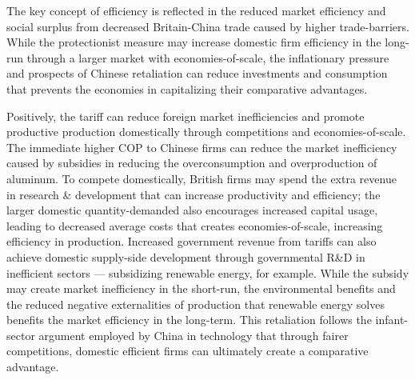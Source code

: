 \documentclass[a4paper,12pt]{article}
\newcommand{\tikzfig}[1]{}
\begin{document}
The key concept of efficiency is reflected in the reduced market efficiency and social surplus from decreased Britain-China trade caused by higher trade-barriers. While the protectionist measure may increase domestic firm efficiency in the long-run through a larger market with economies-of-scale, the inflationary pressure and prospects of Chinese retaliation can reduce investments and consumption that prevents the economies in capitalizing their comparative advantages.


Positively, the tariff can reduce foreign market inefficiencies and promote productive production domestically through competitions and economies-of-scale. The immediate higher COP to Chinese firms can reduce the market inefficiency caused by subsidies in reducing the overconsumption and overproduction of aluminum. To compete domestically, British firms may spend the extra revenue in research \& development that can increase productivity and efficiency; the larger domestic quantity-demanded also encourages increased capital usage, leading to decreased average costs that creates economies-of-scale, increasing efficiency in production.
Increased government revenue from tariffs can also achieve domestic supply-side development through governmental R\&D in inefficient sectors --- subsidizing renewable energy, for example. While the subsidy may create market inefficiency in the short-run, the environmental benefits and the reduced negative externalities of production that renewable energy solves benefits the market efficiency in the long-term. This retaliation follows the infant-sector argument employed by China in technology that through fairer competitions, domestic efficient firms can ultimately create a comparative advantage.
\end{document}
